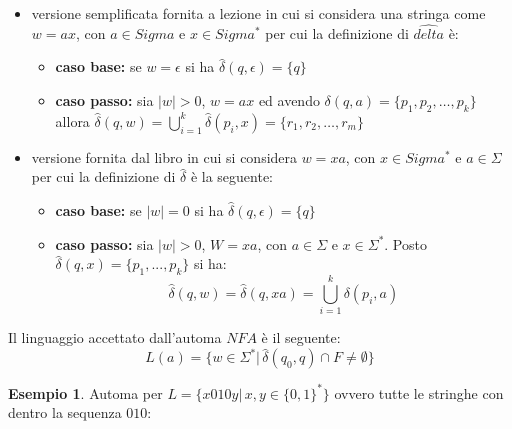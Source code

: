 \documentclass[a4paper]{book}
\theoremstyle{definition}%
\newtheorem*{esempio}{Esempio}
\begin{document}
\begin{itemize}
  \item versione semplificata fornita a lezione in cui si considera una stringa come $w = ax$,
        con $a \in Sigma$ e $x \in Sigma^*$ per cui la definizione di $\hat{delta}$ è:
        \begin{itemize}
          \item \textbf{caso base:} se $w = \epsilon$ si ha $\hat{\delta}(q, \epsilon) = \{q\}$
          \item \textbf{caso passo:} sia $|w| > 0$, $w = ax$ ed avendo $\delta(q, a) = \{p_1, p_2,\dots, p_k\}$
                allora $\hat{\delta}(q, w) = \bigcup _{i = 1} ^ k \hat{\delta}(p_i, x) = \{r_1, r_2,\dots, r_m\}$
        \end{itemize}

  \item versione fornita dal libro in cui si considera $w = xa$, con $x \in Sigma^*$
        e $a \in \Sigma$ per cui la definizione di $\hat{\delta}$ è la seguente:
        \begin{itemize}
          \item \textbf{caso base:} se $|w|=0$ si ha $\hat{\delta}(q,\epsilon) =\{q\}$
          \item \textbf{caso passo:} sia $|w|>0$, $W=xa$, con $a\in\Sigma$ e $x\in\Sigma^*$.\newline
          Posto $\hat{\delta}(q, x)=\{p_1,...,p_k\}$ si ha:
          \[ \hat{\delta}(q, w) = \hat{\delta}(q, xa) = \bigcup _{i = 1} ^ k \delta(p_i, a) \]
        \end{itemize}
\end{itemize}
Il linguaggio accettato dall'automa $NFA$ è il seguente:
\[ L(a) = \{w\in \Sigma^*|\, \hat{\delta}(q_0, q) \cap F \neq \emptyset\} \]
\begin{esempio}
Automa per $L=\{x010y|\,x,y\in\{0,1\}^*\}$ ovvero tutte le stringhe con dentro la sequenza $010$:
\begin{center}
\end{center}
\end{esempio}
\end{document}
